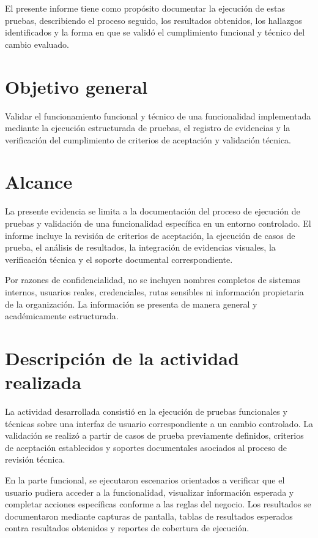 \documentclass[12pt]{article}
\begin{document}
El presente informe tiene como propósito documentar la ejecución de estas pruebas, describiendo el proceso seguido, los resultados obtenidos, los hallazgos identificados y la forma en que se validó el cumplimiento funcional y técnico del cambio evaluado.

\section*{Objetivo general}

Validar el funcionamiento funcional y técnico de una funcionalidad implementada mediante la ejecución estructurada de pruebas, el registro de evidencias y la verificación del cumplimiento de criterios de aceptación y validación técnica.

\section*{Alcance}

La presente evidencia se limita a la documentación del proceso de ejecución de pruebas y validación de una funcionalidad específica en un entorno controlado. El informe incluye la revisión de criterios de aceptación, la ejecución de casos de prueba, el análisis de resultados, la integración de evidencias visuales, la verificación técnica y el soporte documental correspondiente.

Por razones de confidencialidad, no se incluyen nombres completos de sistemas internos, usuarios reales, credenciales, rutas sensibles ni información propietaria de la organización. La información se presenta de manera general y académicamente estructurada.

\section*{Descripción de la actividad realizada}

La actividad desarrollada consistió en la ejecución de pruebas funcionales y técnicas sobre una interfaz de usuario correspondiente a un cambio controlado. La validación se realizó a partir de casos de prueba previamente definidos, criterios de aceptación establecidos y soportes documentales asociados al proceso de revisión técnica.

En la parte funcional, se ejecutaron escenarios orientados a verificar que el usuario pudiera acceder a la funcionalidad, visualizar información esperada y completar acciones específicas conforme a las reglas del negocio. Los resultados se documentaron mediante capturas de pantalla, tablas de resultados esperados contra resultados obtenidos y reportes de cobertura de ejecución.
\end{document}
